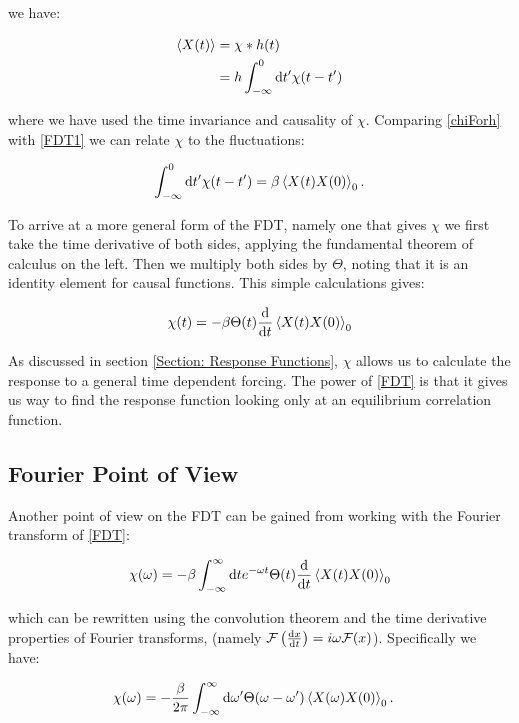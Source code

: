 \noindent we have: 

\begin{align}
\expval{X(t)} &= \chi * h(t) \\
&= h \int_{-\infty}^0 \dd t' \chi(t - t') \label{chiForh}
\end{align}

\noindent where we have used the time invariance and causality of $\chi$. Comparing \ref{chiForh} with \ref{FDT1} we can relate $\chi$ to the fluctuations:

\begin{align}
 \int_{-\infty}^0 \dd t' \chi(t - t') = \beta \expval{X(t)X(0)}_0 .
\end{align}

\noindent To arrive at a more general form of the FDT, namely one that gives $\chi$ we first take the time derivative of both sides, applying the fundamental theorem of calculus on the left. Then we multiply both sides by $\Theta$, noting that it is an identity element for causal functions. This simple calculations gives:

\begin{align}
\chi(t) = - \beta \Theta (t) \dv{t}\expval{X(t)X(0)}_0  \label{FDT}
\end{align}

\noindent As discussed in section \ref{Section: Response Functions}, $\chi$ allows us to calculate the response to a general time dependent forcing. The power of \ref{FDT} is that it gives us way to find the response function looking only at an equilibrium correlation function.

\subsection{Fourier Point of View}

Another point of view on the FDT can be gained from working with the Fourier transform of \ref{FDT}: 

\begin{align}
\chi(\omega) = - \beta \int_{-\infty}^{\infty} \dd t  e^{-\omega t} \Theta(t) \dv{t}\expval{X(t)X(0)}_0
\end{align}

\noindent which can be rewritten using the convolution theorem and the time derivative properties of Fourier transforms, (namely $\mathcal{F} \left( \dv{x}{t} \right) = i \omega \mathcal{F} (x)$). Specifically we have:

\begin{align}
\chi(\omega) &= - \frac{\beta}{2 \pi} \int_{-\infty}^{\infty} \dd \omega ' \Theta(\omega - \omega ') \expval{X(\omega)X(0)}_0.
\end{align}

